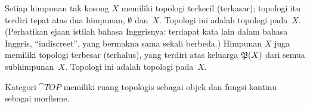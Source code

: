 \begin{exam} Setiap himpunan tak kosong $X$ memiliki topologi terkecil (terkasar); topologi itu terdiri tepat atas dua himpunan,
$\emptyset$ dan~$X$. Topologi ini adalah topologi
 pada~$X$. (Perhatikan ejaan istilah bahasa Inggrisnya: terdapat kata lain dalam bahasa Inggris, ``indiscreet'',
yang bermakna sama sekali berbeda.) Himpunan $X$ juga memiliki topologi terbesar (terhalus), yang terdiri atas
keluarga $\mathfrak{P}(X)$ dari semua subhimpunan~$X$. Topologi ini adalah topologi
 pada~$X$.
  \end{exam}

\begin{exam} Kategori
$\cat{TOP}$ memiliki ruang topologis sebagai objek dan fungsi kontinu sebagai morfisme.
\end{exam}

